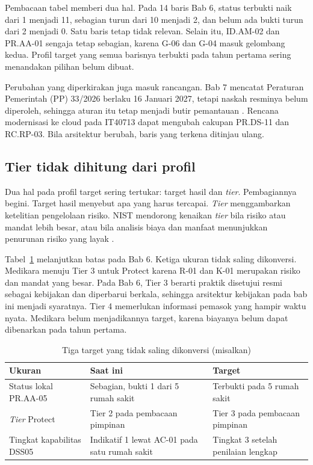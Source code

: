 Pembacaan tabel memberi dua hal. Pada 14 baris Bab 6, status terbukti naik dari 1 menjadi 11,
sebagian turun dari 10 menjadi 2, dan belum ada bukti turun dari 2 menjadi 0. Satu baris tetap
tidak relevan. Selain itu, ID.AM-02 dan PR.AA-01 sengaja tetap sebagian, karena G-06 dan G-04
masuk gelombang kedua. Profil target yang semua barisnya terbukti pada tahun pertama sering
menandakan pilihan belum dibuat.

Perubahan yang diperkirakan juga masuk rancangan. Bab 7 mencatat Peraturan Pemerintah (PP)
33/2026 berlaku 16 Januari 2027, tetapi naskah resminya belum diperoleh, sehingga aturan itu
tetap menjadi butir pemantauan \cite{bpom-pp33-2026-status}. Rencana modernisasi ke cloud pada
IT40713 dapat mengubah cakupan PR.DS-11 dan RC.RP-03. Bila arsitektur berubah, baris yang
terkena ditinjau ulang.

\subsection*{Tier tidak dihitung dari profil}

Dua hal pada profil target sering tertukar: target hasil dan \textit{tier}. Pembagiannya begini.
Target hasil menyebut apa yang harus tercapai. \textit{Tier} menggambarkan ketelitian pengelolaan
risiko. NIST mendorong kenaikan \textit{tier} bila risiko atau mandat lebih besar, atau bila
analisis biaya dan manfaat menunjukkan penurunan risiko yang layak \cite{nistcsf2}.

Tabel~\ref{tab:ch08-tiga-target} melanjutkan batas pada Bab 6. Ketiga ukuran tidak saling
dikonversi. Medikara menuju Tier 3 untuk Protect karena R-01 dan K-01 merupakan risiko dan mandat
yang besar. Pada Bab 6, Tier 3 berarti praktik disetujui resmi sebagai kebijakan dan diperbarui
berkala, sehingga arsitektur kebijakan pada bab ini menjadi syaratnya. Tier 4 memerlukan
informasi pemasok yang hampir waktu nyata. Medikara belum menjadikannya target, karena biayanya
belum dapat dibenarkan pada tahun pertama.

\begin{table}[!htb]
  \centering\small
  \caption{Tiga target yang tidak saling dikonversi (misalkan)}\label{tab:ch08-tiga-target}
  \begin{tabularx}{\textwidth}{|>{\raggedright\arraybackslash}p{}|>{\raggedright\arraybackslash}X|>{\raggedright\arraybackslash}X|}
    \hline
    \textbf{Ukuran} & \textbf{Saat ini} & \textbf{Target} \\ \hline
    Status lokal PR.AA-05 & Sebagian, bukti 1 dari 5 rumah sakit & Terbukti pada 5 rumah sakit \\
    \hline
    \textit{Tier} Protect & Tier 2 pada pembacaan pimpinan & Tier 3 pada pembacaan pimpinan \\
    \hline
    Tingkat kapabilitas DSS05 & Indikatif 1 lewat AC-01 pada satu rumah sakit & Tingkat 3 setelah
    penilaian lengkap \\ \hline
  \end{tabularx}
\end{table}

